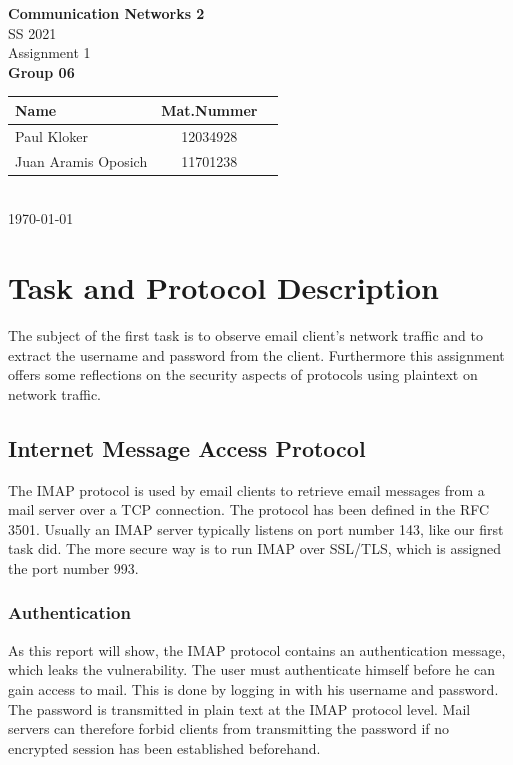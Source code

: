 \documentclass[parskip=full]{scrartcl}
\begin{document}
\begin{titlepage}
    \centering
    \vspace*{2cm}
    {\Huge \textbf{Communication Networks 2}}\\
    SS 2021\\
    \vspace*{1cm}
    {\Large Assignment 1}
    \\\vspace*{3cm}
    {\Large \textbf{Group 06}}\\
    \vspace*{1cm}
    {\large 
        \begin{tabular}{l c c}
            Name & Mat.Nummer \\ \hline
            Paul Kloker & 12034928 \\
            Juan Aramis Oposich & 11701238
        \end{tabular}
    }
    \\\vspace*{7cm}
    \today
\end{titlepage}

\section{Task and Protocol Description} \label{sec:task}

The subject of the first task is to observe email client’s network traffic and to extract the username and password from the client.  Furthermore this assignment offers some reflections on the security aspects of protocols using plaintext on network traffic.

\subsection{Internet Message Access Protocol}
The IMAP protocol is used by email clients to retrieve email messages from a mail server over a TCP connection. The protocol has been defined in the RFC 3501. Usually an IMAP server typically listens on port number 143, like our first task did. The more secure way is to run IMAP over SSL/TLS, which is assigned the port number 993.

\subsubsection{Authentication}
As this report will show, the IMAP protocol contains an authentication message, which leaks the vulnerability. The user must authenticate himself before he can gain access to mail. This is done by logging in with his username and password. The password is transmitted in plain text at the IMAP protocol level. Mail servers can therefore forbid clients from transmitting the password if no encrypted session has been established beforehand.\\
\end{document}
